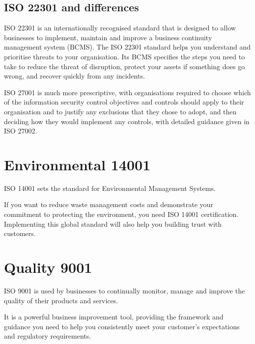 \documentclass[a4paper,12pt]{article}
\begin{document}
\subsection{ISO 22301 and differences}

ISO 22301 is an internationally recognised standard that is designed to allow businesses to implement, maintain and improve a business continuity management system (BCMS). The ISO 22301 standard helps you understand and prioritise threats to your organisation. Its BCMS specifies the steps you need to take to reduce the threat of disruption, protect your assets if something does go wrong, and recover quickly from any incidents.

ISO 27001 is much more prescriptive, with organisations required to choose which of the
information security control objectives and controls should apply to their organisation and to justify
any exclusions that they chose to adopt, and then deciding how they would implement any controls,
with detailed guidance given in ISO 27002.


\section{Environmental 14001}
ISO 14001 sets the standard for Environmental Management Systems.

If you want to reduce waste management costs and demonstrate your commitment to protecting the environment, you need ISO 14001 certification. Implementing this global standard will also help you building trust with customers.

\section{Quality 9001}
ISO 9001 is used by businesses to continually monitor, manage and improve the quality of their products and services.

It is a powerful business improvement tool, providing the framework and guidance you need to help you consistently meet your customer’s expectations and regulatory requirements.

\clearpage

\printindex
\end{document}
